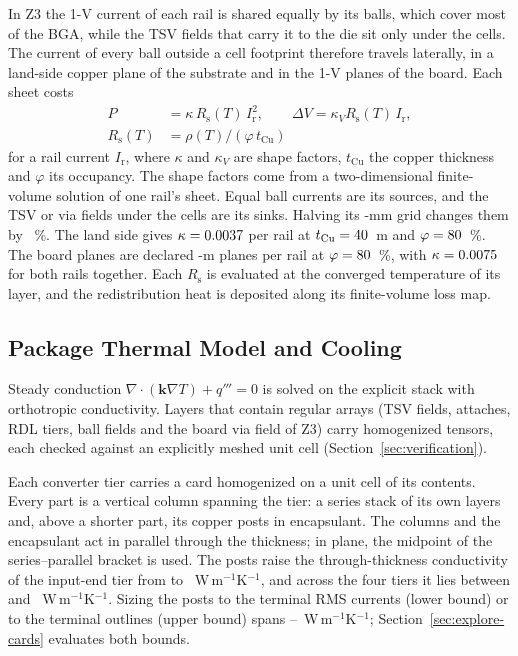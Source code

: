 In Z3 the 1-V current of each rail is shared equally by its balls, which cover most of the BGA,
while the TSV fields that carry it to the die sit only under the cells. The current of every ball
outside a cell footprint therefore travels laterally, in a land-side copper plane of the
substrate and in the 1-V planes of the board. Each sheet costs
\begin{equation}
\begin{aligned}
P &= \kappa\, R_{\mathrm{s}}(T)\, I_{\mathrm{r}}^2,\qquad
\Delta V = \kappa_V R_{\mathrm{s}}(T)\, I_{\mathrm{r}},\\
R_{\mathrm{s}}(T) &= \rho(T)/(\varphi\, t_{\mathrm{Cu}})
\end{aligned}
\label{eq:sheet}
\end{equation}
for a rail current $I_{\mathrm{r}}$, where $\kappa$ and $\kappa_V$ are shape factors, $t_{\mathrm{Cu}}$
the copper thickness and $\varphi$ its occupancy. The shape factors come from a two-dimensional
finite-volume solution of one rail's sheet. Equal ball currents are its sources, and the TSV or
via fields under the cells are its sinks. Halving its \MthLandGrid-mm grid changes them by
\MthLandGridChk~\%. The land side gives $\kappa = 0.0037$ per rail at
$t_{\mathrm{Cu}} = 40$~\textmu m and $\varphi = 80$~\%. The board planes are
\MthPlaneNWord{} declared \MthPlaneT-\textmu m planes per rail at $\varphi = 80$~\%, with
$\kappa = 0.0075$ for both rails together. Each $R_{\mathrm{s}}$ is evaluated at the
converged temperature of its layer, and the redistribution heat is deposited along its
finite-volume loss map.

\subsection{Package Thermal Model and Cooling}\label{sec:thermal}
Steady conduction $\nabla\!\cdot(\mathbf{k}\nabla T) + q''' = 0$ is solved on the explicit
stack with orthotropic conductivity. Layers that contain regular arrays (TSV fields, attaches,
RDL tiers, ball fields and the board via field of Z3) carry homogenized tensors, each checked
against an explicitly meshed unit cell (Section~\ref{sec:verification}).

Each converter tier carries a card homogenized on a unit cell of its contents. Every part is a
vertical column spanning the tier: a series stack of its own layers and, above a shorter part,
its copper posts in encapsulant. The columns and the encapsulant act in parallel through the
thickness; in plane, the midpoint of the series--parallel bracket is used. The posts raise the
through-thickness conductivity of the input-end tier from \MthKzTierOneEncap{} to
\MthKzTierOne~W\,m$^{-1}$K$^{-1}$, and across the four tiers it lies between \MthKzLo{} and
\MthKzHi~W\,m$^{-1}$K$^{-1}$. Sizing the posts to the terminal RMS currents (lower bound) or to
the terminal outlines (upper bound) spans \MthKzPostLo--\MthKzPostHi~W\,m$^{-1}$K$^{-1}$;
Section~\ref{sec:explore-cards} evaluates both bounds.

